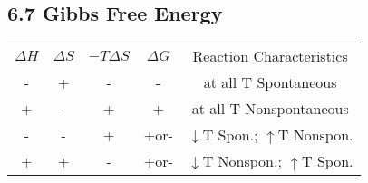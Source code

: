 \subsection{6.7 Gibbs Free Energy}

    
    \begin{center}
        \begin{tabular}{ |c|c|c|c|c| } 
         \hline
         $\Delta H$ & $\Delta S$ & $-T\Delta S$ & $\Delta G$ & Reaction Characteristics \\ 
         - & + & - & - & at all T Spontaneous \\ 
         + & - & + & + & at all T Nonspontaneous \\ 
         - & - & + & +or- & $\downarrow$T Spon.; $\uparrow$T Nonspon.\\
         + & + & - & +or- & $\downarrow$T Nonspon.; $\uparrow$T Spon. \\
         \hline
        \end{tabular}
    \end{center}
    \vspace*{0.5em}
